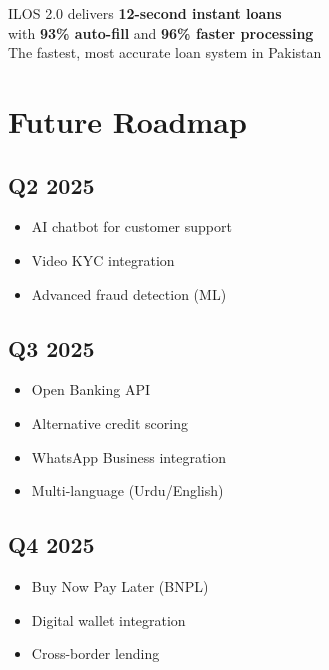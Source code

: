 \documentclass[11pt,a4paper]{article}
\begin{document}
\begin{tcolorbox}[colback=highlightcolor,colframe=tealcolor,title=\textbf{Bottom Line}]
\centering
\Large
ILOS 2.0 delivers \textbf{12-second instant loans}\\
with \textbf{93\% auto-fill} and \textbf{96\% faster processing}\\[0.3cm]
\large
The fastest, most accurate loan system in Pakistan
\end{tcolorbox}

\section{Future Roadmap}

\subsection{Q2 2025}
\begin{itemize}[leftmargin=*,noitemsep]
    \item AI chatbot for customer support
    \item Video KYC integration
    \item Advanced fraud detection (ML)
\end{itemize}

\subsection{Q3 2025}
\begin{itemize}[leftmargin=*,noitemsep]
    \item Open Banking API
    \item Alternative credit scoring
    \item WhatsApp Business integration
    \item Multi-language (Urdu/English)
\end{itemize}

\subsection{Q4 2025}
\begin{itemize}[leftmargin=*,noitemsep]
    \item Buy Now Pay Later (BNPL)
    \item Digital wallet integration
    \item Cross-border lending
\end{itemize}

\newpage
\end{document}
